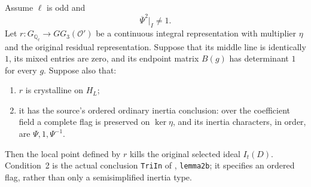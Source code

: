 \begin{proposition}
\label{AC-G48-TypeII}
Assume $\ell$ is odd and
\[
              \overline\Psi^{2}|_I\ne1.               \tag{G48.6}
\]
Let $r:G_{\mathbb Q_\ell}\to GG_3(\mathcal O')$ be
a continuous integral representation with multiplier $\eta$
and the original residual representation.  Suppose that its
middle line is identically $1$, its mixed entries are zero,
and its endpoint matrix $B(g)$ has determinant $1$ for every
$g$.  Suppose also that:

\begin{enumerate}
\item $r$ is crystalline on $H_L$;
\item it has the source's ordered ordinary inertia conclusion:
over the coefficient field a complete flag is preserved on
$\ker\eta$, and its inertia characters, in order, are
$\Psi,1,\Psi^{-1}$.
\end{enumerate}

Then the local point defined by $r$ kills the original
selected ideal $I_t(D)$.
Condition~2 is the actual conclusion \texttt{TriIn} of
,
\texttt{lemma2b}; it specifies an ordered flag, rather
than only a semisimplified inertia type.
\end{proposition}
